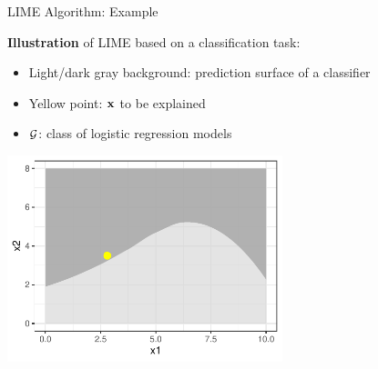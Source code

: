 \documentclass[10pt,compress,t,notes=noshow, xcolor=table]{beamer}
\begin{document}
\begin{frame}{LIME Algorithm: Example}

    	\textbf{Illustration} of LIME based on a classification task:
		\begin{itemize}
			\item Light/dark gray background: prediction surface of a classifier
			\item Yellow point: $\mathbf{x}$ to be explained
			\item $\mathcal{G}$: class of logistic regression models 
		\end{itemize}
		\begin{center}
			\includegraphics[width=0.6\textwidth]{figure/lime2}
		\end{center}

\end{frame} 
\end{document}
